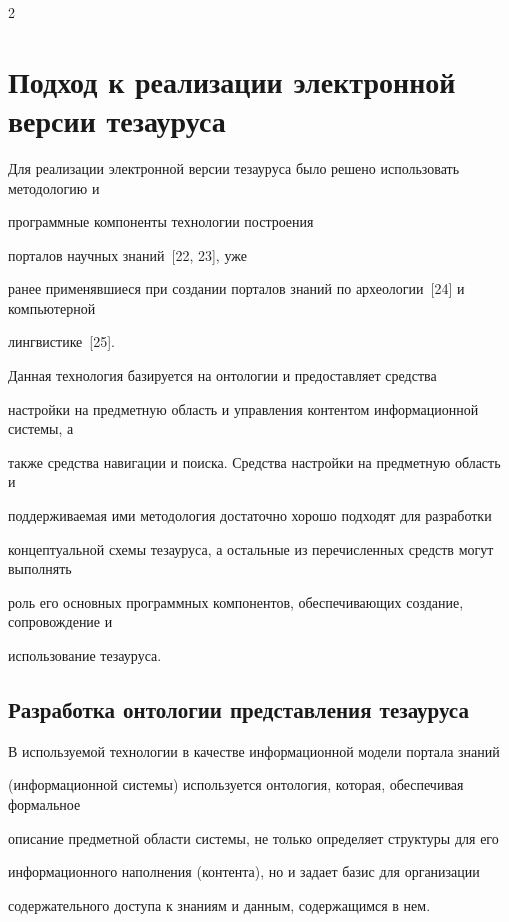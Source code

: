 \begin{multicols}{2}
\section{Подход к реализации электронной версии тезауруса}



  Для реализации электронной версии тезауруса было решено использовать методологию и 

программные компоненты технологии построения\linebreak

порталов научных знаний~[22, 23], уже 

ранее применявшиеся при создании порталов знаний по археологии~[24] и компьютерной 

лингвистике~[25].\linebreak

Данная технология базируется на онтологии и предоставляет средства 

настройки на предметную область и управления контентом информационной системы, а 

также средства навигации и поиска. Средства настройки на предметную область и 

поддерживаемая ими методология достаточно хорошо подходят для разработки 

концептуальной схемы тезауруса, а остальные из перечисленных средств могут выполнять 

роль его основных программных компонентов, обеспечивающих создание, сопровождение и 

использование тезауруса.



\subsection{Разработка онтологии представления тезауруса}



  В используемой технологии в качестве информационной модели портала знаний 

(информа\-ци\-он\-ной системы) используется онтология, \mbox{которая}, обеспечивая формальное 

описание предметной области системы, не только определяет структуры для его 

информационного наполнения (контента), но и задает базис для организации 

содержательного доступа к знаниям и данным, содержащимся в нем.


\end{multicols}
